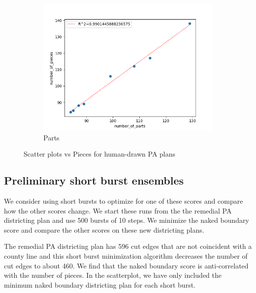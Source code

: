 \documentclass{mgggarticle}
\begin{document}
\begin{figure}
\begin{subfigure}{0.4\textwidth}
\centering
\includegraphics[width=\textwidth]{figs/scatters/parts.png}
\caption{Parts}
\end{subfigure}
\caption{Scatter plots vs Pieces for human-drawn PA plans}
\end{figure}

\subsection{Preliminary short burst ensembles}
We consider using short bursts to optimize for one of these scores and compare how the other scores change. We start these runs from the the remedial PA districting plan and use 500 bursts of 10 steps. We minimize the naked boundary score and compare the other scores on these new districting plans. 

The remedial PA districting plan has 596 cut edges that are not coincident with a county line and this short burst minimization algorithm decreases the number of cut edges to about 460. We find that the naked boundary score is anti-correlated with the number of pieces. In the scatterplot, we have only included the minimum naked boundary districting plan for each short burst.
\end{document}
